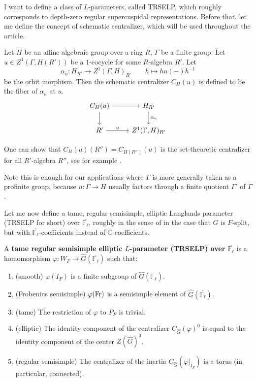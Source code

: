 	I want to define a class of $L$-parameters, called TRSELP, which roughly corresponds to depth-zero regular supercuspidal representations. Before that, let me define the concept of schematic centralizer, which will be used throughout the article.
	
	\begin{definition}
	Let $H$ be an affine algebraic group over a ring $R$, $\Gamma$ be a finite group. Let $u \in Z^1(\Gamma, H(R'))$ be a $1$-cocycle for some $R$-algebra $R'$. Let 
	$$\alpha_u: H_{R'} \longrightarrow Z^1(\Gamma, H)_{R'}\qquad h \longmapsto hu(-)h^{-1}$$
	 be the orbit morphism. Then the schematic centralizer $C_H(u)$ is defined to be the fiber of $\alpha_u$ at $u$.
	$$	
	\begin{tikzcd}
		{C_H(u)} \arrow[r, ""] \arrow[d, ""] & {H_{R'}} \arrow[d, "{\alpha_u}"] \\
		{R'} \arrow[r, "u"]                & {Z^1(\Gamma, H)_{R'}}               
	\end{tikzcd}
	$$	
	\end{definition}
	
	One can show that $C_H(u)(R'')=C_{H(R'')}(u)$ is the set-theoretic centralizer for all $R'$-algebra $R''$, see for example \cite[Appendix A]{dhkm2020moduli}.
	
	\begin{remark}
			Note this is enough for our applications where $\Gamma$ is more generally taken as a profinite group, because $u: \Gamma \to H$ usually factors through a finite quotient $\Gamma'$ of $\Gamma$.
	\end{remark}
	
	Let me now define a tame, regular semisimple, elliptic Langlands parameter (TRSELP for short) over $\overline{\mathbb{F}_{\ell}}$, roughly in the sense of \cite[Section 3.4 and Section 4.1]{debacker2009depth} in the case that $G$ is $F$-split, but with $\overline{\mathbb{F}_{\ell}}$-coefficients instead of $\mathbb{C}$-coefficients.
	
	\begin{definition}\label{Def TRSELP}
		A \textbf{tame regular semisimple elliptic $L$-parameter (TRSELP) over $\overline{\mathbb{F}_{\ell}}$} is a homomorphism $\varphi: W_F \to \hat{G}(\overline{\mathbb{F}_{\ell}})$ such that:
		\begin{enumerate}
			\item (smooth) $\varphi(I_F)$ is a finite subgroup of $\hat{G}(\overline{\mathbb{F}_{\ell}})$.
			\item (Frobenius semisimple) $\varphi(\operatorname{Fr})$ is a semisimple element of $\hat{G}(\overline{\mathbb{F}_{\ell}})$.
			\item (tame) The restriction of $\varphi$ to $P_F$ is trivial.
			\item \label{elliptic} (elliptic) The identity component of the centralizer $C_{\hat{G}}(\varphi)^0$ is equal to the identity component of the center $Z(\hat{G})^0$.
			\item \label{regular semisimple}(regular semisimple) The centralizer of the inertia $C_{\hat{G}}(\varphi|_{I_F})$ is a torus (in particular, connected).
		\end{enumerate}
	\end{definition}

